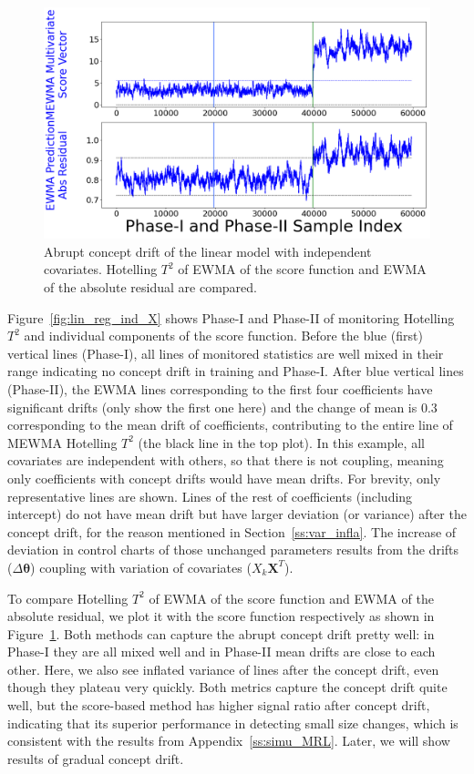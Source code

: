 \documentclass[twoside,11pt]{article}
\begin{document}
\begin{appendix}
\begin{enumerate}[(I)]
\begin{figure}[!htp]
\centering
\includegraphics[width = 0.6\linewidth]{../figures/v14/sim_2/reg/1_sim2_lin_1e-08_0_005_1.png}
  \caption{Abrupt concept drift of the linear model with independent covariates. Hotelling $T^2$ of EWMA of the score function and EWMA of the absolute residual are compared.}
  \label{fig:lin_reg_ind_X_comp}
\end{figure}

Figure~\ref{fig:lin_reg_ind_X} shows Phase-I and Phase-II of monitoring Hotelling $T^2$ and individual components of the score function. Before the blue (first) vertical lines (Phase-I), all lines of monitored statistics are well mixed in their range indicating no concept drift in training and Phase-I. After blue vertical lines (Phase-II), the EWMA lines corresponding to the first four coefficients have significant drifts (only show the first one here) and the change of mean is $0.3$ corresponding to the mean drift of coefficients, contributing to the entire line of MEWMA Hotelling $T^2$ (the black line in the top plot). In this example, all covariates are independent with others, so that there is not coupling, meaning only coefficients with concept drifts would have mean drifts. For brevity, only representative lines are shown. Lines of the rest of coefficients (including intercept) do not have mean drift but have larger deviation (or variance) after the concept drift, for the reason mentioned in Section~\ref{ss:var_infla}. The increase of deviation in control charts of those unchanged parameters results from the drifts ($\Delta \bm { \theta}$) coupling with variation of covariates ($X_k\bm {X}^T$).

To compare Hotelling $T^2$ of EWMA of the score function and EWMA of the absolute residual, we plot it with the score function respectively as shown in Figure~\ref{fig:lin_reg_ind_X_comp}. Both methods can capture the abrupt concept drift pretty well: in Phase-I they are all mixed well and in Phase-II mean drifts are close to each other. Here, we also see inflated variance of lines after the concept drift, even though they plateau very quickly. Both metrics capture the concept drift quite well, but the score-based method has higher signal ratio after concept drift, indicating that its superior performance in detecting small size changes, which is consistent with the results from Appendix~\ref{ss:simu_MRL}. Later, we will show results of gradual concept drift.


\end{enumerate}
\end{appendix}
\end{document}
